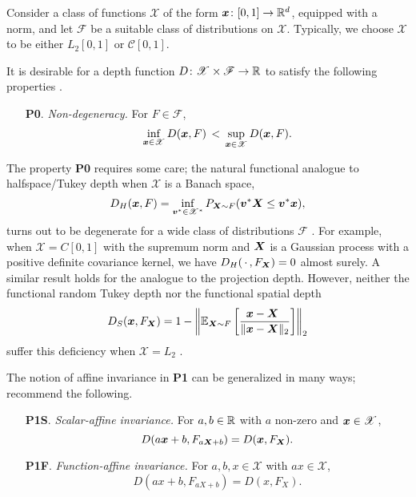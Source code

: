 Consider a class of functions $\mathscr{X}$ of the form $\bm{x}\colon [0, 1] \to
\mathbb{R}^d$, equipped with a norm, and let $\mathscr{F}$ be a suitable class of
distributions on $\mathscr{X}$.
Typically, we choose $\mathscr{X}$ to be either $L_2[0, 1]$ or $\mathcal{C}[0,
1]$.

It is desirable for a depth function $D\colon \mathscr{X} \times \mathscr{F}
\to \mathbb{R}$ to satisfy the following properties \parencite{gijbels-nagy-2017}.
\begin{enumerate}
    \item[\textbf{P0}.] \emph{Non-degeneracy.}
    For $F \in \mathscr{F}$,
    \begin{equation}
        \inf_{\bm{x} \in \mathscr{X}} D(\bm{x}, F) \,<\,
        \sup_{\bm{x} \in \mathscr{X}} D(\bm{x}, F).
    \end{equation}
\end{enumerate}

The property \textbf{P0} requires some care; the natural functional analogue
to halfspace/Tukey depth when $\mathscr{X}$ is a Banach space,
\begin{equation}
    D_H(\bm{x}, F) = \inf_{\bm{v}^* \in \mathscr{X}^*} P_{\bm{X} \sim F}(\bm{v}^*\bm{X} \leq \bm{v}^*\bm{x}),
\end{equation}
turns out to be degenerate for a wide class of distributions $\mathscr{F}$
\parencite{chakraborty-chaudhuri-2014a}.
For example, when $\mathscr{X} = C[0, 1]$ with the supremum norm and $\bm{X}$ is
a Gaussian process with a positive definite covariance kernel, we have
$D_H(\,\cdot\,, F_{\bm{X}}) = 0$ almost surely.
A similar result holds for the analogue to the projection depth.
However, neither the functional random Tukey depth nor the functional spatial
depth
\begin{equation}
    D_S(\bm{x}, F_{\bm{X}}) = 1 - \left\Vert \operatorname{\mathbb{E}}_{\bm{X} \sim F} \left[\frac{\bm{x} - \bm{X}\;\,}{\Vert \bm{x} - \bm{X} \Vert_2}\right] \right\Vert_2
\end{equation}
suffer this deficiency when $\mathscr{X} = L_2$
\parencite{albertos-reyes-2008a, gijbels-nagy-2017}.



The notion of affine invariance in \textbf{P1} can be generalized in many
ways; \textcite{gijbels-nagy-2017} recommend the following.

\begin{enumerate}
    \item[\textbf{P1S}.] \emph{Scalar-affine invariance.}
    For $a, b \in \mathbb{R}$ with $a$ non-zero and $\bm{x} \in \mathscr{X}$,
    \begin{equation}
        D(a\bm{x} + b, F_{a\bm{X} + b}) = D(\bm{x}, F_{\bm{X}}).
    \end{equation}

    \item[\textbf{P1F}.] \emph{Function-affine invariance.}
    For $a, b, x \in \mathscr{X}$ with $ax \in \mathscr{X}$,
    \begin{equation}
        D(ax + b, F_{aX + b}) = D(x, F_{X}).
    \end{equation}
\end{enumerate}


